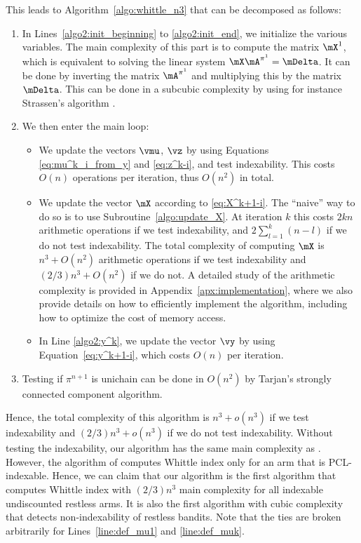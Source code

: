 This leads to Algorithm~\ref{algo:whittle_n3} that can be decomposed as follows:
\begin{enumerate}
    \item In Lines~\ref{algo2:init_beginning} to \ref{algo2:init_end}, we initialize the various variables. The main complexity of this part is to compute the matrix $\mX^1$, which is equivalent to solving the linear system $\mX\mA^{\pi^1}=\mDelta$. It can be done by inverting the matrix $\mA^{\pi^1}$ and multiplying this by the matrix $\mDelta$. This can be done in a subcubic complexity by using for instance Strassen's algorithm \cite{strassen1969gaussian}.
    \item We then enter the main loop:
        \begin{itemize}
            \item We update the vectors $\vmu$, $\vz$ by using Equations \eqref{eq:mu^k_i_from_y} and \eqref{eq:z^k-i}, and test indexability. This costs $O(n)$ operations per iteration, thus $O(n^2)$ in total.
            \item We update the vector $\mX$ according to \eqref{eq:X^k+1-i}. The ``naive'' way to do so is to use Subroutine~\ref{algo:update_X}. At iteration $k$ this costs $2kn$ arithmetic operations if we test indexability, and $2\sum_{l=1}^{k}(n-l)$ if we do not test indexability. The total complexity of computing $\mX$ is $n^3 +O(n^2)$ arithmetic operations if we test indexability and $(2/3)n^3 +O(n^2)$ if we do not.
              A detailed study of the arithmetic complexity is provided in Appendix~\ref{apx:implementation}, where we also provide details on how to efficiently implement the algorithm, including how to optimize the cost of memory access.
            \item In Line \ref{algo2:y^k}, we update the vector $\vy$ by using Equation~\eqref{eq:y^k+1-i}, which costs $O(n)$ per iteration. 
        \end{itemize}
    \item Testing if $\pi^{n+1}$ is unichain can be done in $O(n^2)$ by Tarjan's strongly connected component algorithm.
\end{enumerate}
Hence, the total complexity of this algorithm is $n^3+o(n^3)$ if we test indexability and $(2/3)n^3+o(n^3)$ if we do not test indexability. Without testing the indexability, our algorithm has the same main complexity as \cite{nino2020fast}. However, the algorithm of \cite{nino2020fast} computes Whittle index only for an arm that is PCL-indexable. Hence, we can claim that our algorithm is the first algorithm that computes Whittle index with $(2/3)n^3$ main complexity for all indexable undiscounted restless arms. It is also the first algorithm with cubic complexity that detects non-indexability of restless bandits.
Note that the ties are broken arbitrarily for Lines~\ref{line:def_mu1} and \ref{line:def_muk}.


